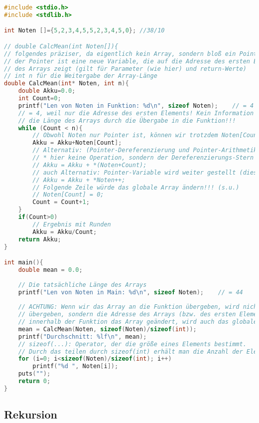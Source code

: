 \begin{lstlisting}[language=C]
#include <stdio.h>
#include <stdlib.h>

int Noten []={5,2,3,4,5,5,2,3,4,5,0}; //38/10

// double CalcMean(int Noten[]){
// folgendes präziser, da eigentlich kein Array, sondern bloß ein Pointer übergeben wird, 
// der Pointer ist eine neue Variable, die auf die Adresse des ersten Elements
// des Arrays zeigt (gilt für Parameter (wie hier) und return-Werte)
// int n für die Weitergabe der Array-Länge
double CalcMean(int* Noten, int n){	
	double Akku=0.0;
	int Count=0;
	printf("Len von Noten in Funktion: %d\n", sizeof Noten);	// = 4
	// = 4, weil nur die Adresse des ersten Elements! Kein Information über 
	// die Länge des Arrays durch die Übergabe in die Funktion!!!
	while (Count < n){
		// Obwohl Noten nur Pointer ist, können wir trotzdem Noten[Count] verwenden
		Akku = Akku+Noten[Count];
		// Alternativ: (Pointer-Dereferenzierung und Pointer-Arithmetik)
		// * hier keine Operation, sondern der Dereferenzierungs-Stern
		// Akku = Akku + *(Noten+Count);
		// auch Alternativ: Pointer-Variable wird weiter gestellt (diese ist nicht global)
		// Akku = Akku + *Noten++;
		// Folgende Zeile würde das globale Array ändern!!! (s.u.)		
		// Noten[Count] = 0;
		Count = Count+1;
	}
	if(Count>0)
		// Ergebnis mit Runden
		Akku = Akku/Count;
	return Akku;
}

int main(){
	double mean = 0.0;
	
	// Die tatsächliche Länge des Arrays
	printf("Len von Noten in Main: %d\n", sizeof Noten);	// = 44
	
	// ACHTUNG: Wenn wir das Array an die Funktion übergeben, wird nicht das Array selbst
	// übergeben, sondern die Adresse des Arrays (bzw. des ersten Elements)! Wird also 
	// innerhalb der Funktion das Array geändert, wird auch das globale Array geändert
	mean = CalcMean(Noten, sizeof(Noten)/sizeof(int));
	printf("Durchschnitt: %lf\n", mean);
	// sizeof(...): Operator, der die größe eines Elements bestimmt.
	// Durch das teilen durch sizeof(int) erhält man die Anzahl der Elemente 
	for (i=0; i<sizeof(Noten)/sizeof(int); i++)
		printf("%d ", Noten[i]);
	puts("");
	return 0;
}
\end{lstlisting}

\subsection{Rekursion}

